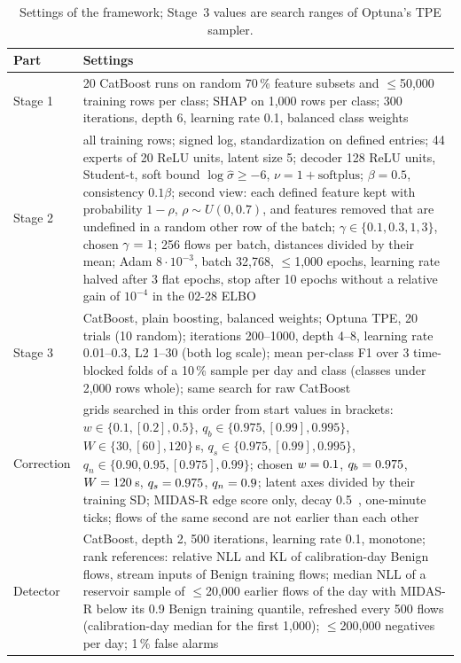 \documentclass[runningheads,a4paper]{llncs}
\begin{document}
\begin{table}[t]
\caption{Settings of the framework; Stage~3 values are search ranges of Optuna's TPE sampler.}\label{tab:settings}
\centering\scriptsize
\setlength{\tabcolsep}{3pt}
\begin{tabular}{L{1.5cm}L{10.27cm}}
\toprule
Part & Settings \\
\midrule
Stage 1 & 20 CatBoost runs on random 70\,\% feature subsets and $\le$50{,}000 training rows per class; SHAP on 1{,}000 rows per class; 300 iterations, depth 6, learning rate 0.1, balanced class weights \\
Stage 2 & all training rows; signed log, standardization on defined entries; 44 experts of 20 ReLU units, latent size 5; decoder 128 ReLU units, Student-t, soft bound $\log\hat\sigma\ge-6$, $\nu=1+\mathrm{softplus}$; $\beta=0.5$, consistency $0.1\beta$; second view: each defined feature kept with probability $1-\rho$, $\rho\sim U(0,0.7)$, and features removed that are undefined in a random other row of the batch; $\gamma\in\{0.1,0.3,1,3\}$, chosen $\gamma=1$; 256 flows per batch, distances divided by their mean; Adam $8{\cdot}10^{-3}$, batch 32{,}768, $\le$1{,}000 epochs, learning rate halved after 3 flat epochs, stop after 10 epochs without a relative gain of $10^{-4}$ in the 02-28 ELBO \\
Stage 3 & CatBoost, plain boosting, balanced weights; Optuna TPE, 20 trials (10 random); iterations 200--1000, depth 4--8, learning rate 0.01--0.3, L2 1--30 (both log scale); mean per-class F1 over 3 time-blocked folds of a 10\,\% sample per day and class (classes under 2{,}000 rows whole); same search for raw CatBoost \\
Correction & grids searched in this order from start values in brackets: $w\in\{0.1,[0.2],0.5\}$, $q_b\in\{0.975,[0.99],0.995\}$, $W\in\{30,[60],120\}$\,s, $q_s\in\{0.975,[0.99],0.995\}$, $q_n\in\{0.90,0.95,[0.975],0.99\}$; chosen $w=0.1$, $q_b=0.975$, $W=120$\,s, $q_s=0.975$, $q_n=0.9$; latent axes divided by their training SD; MIDAS-R edge score only, decay 0.5~\cite{bhatia2020}, one-minute ticks; flows of the same second are not earlier than each other \\
Detector & CatBoost, depth 2, 500 iterations, learning rate 0.1, monotone; rank references: relative NLL and KL of calibration-day Benign flows, stream inputs of Benign training flows; median NLL of a reservoir sample of $\le$20{,}000 earlier flows of the day with MIDAS-R below its 0.9 Benign training quantile, refreshed every 500 flows (calibration-day median for the first 1{,}000); $\le$200{,}000 negatives per day; 1\,\% false alarms \\
\bottomrule
\end{tabular}
\end{table}
\end{document}
